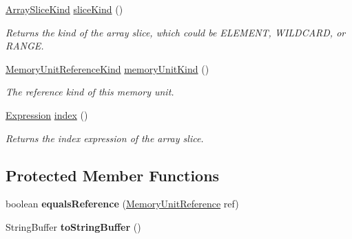 \begin{DoxyCompactItemize}
\hyperlink{enumedu_1_1udel_1_1cis_1_1vsl_1_1civl_1_1model_1_1IF_1_1expression_1_1reference_1_1ArraySliceReference_1_1ArraySliceKind}{Array\+Slice\+Kind} \hyperlink{classedu_1_1udel_1_1cis_1_1vsl_1_1civl_1_1model_1_1common_1_1expression_1_1reference_1_1CommonArraySliceReference_aa7d89fe57ead6201e27048c06e913f10}{slice\+Kind} ()
\begin{DoxyCompactList}\small\item\em Returns the kind of the array slice, which could be E\+L\+E\+M\+E\+N\+T, W\+I\+L\+D\+C\+A\+R\+D, or R\+A\+N\+G\+E. \end{DoxyCompactList}\item 
\hyperlink{enumedu_1_1udel_1_1cis_1_1vsl_1_1civl_1_1model_1_1IF_1_1expression_1_1reference_1_1MemoryUnitRef64a306b012808a0db442488810ff9534}{Memory\+Unit\+Reference\+Kind} \hyperlink{classedu_1_1udel_1_1cis_1_1vsl_1_1civl_1_1model_1_1common_1_1expression_1_1reference_1_1CommonArraySliceReference_ad154fa9f1785372b34334fec41042f1f}{memory\+Unit\+Kind} ()
\begin{DoxyCompactList}\small\item\em The reference kind of this memory unit. \end{DoxyCompactList}\item 
\hyperlink{interfaceedu_1_1udel_1_1cis_1_1vsl_1_1civl_1_1model_1_1IF_1_1expression_1_1Expression}{Expression} \hyperlink{classedu_1_1udel_1_1cis_1_1vsl_1_1civl_1_1model_1_1common_1_1expression_1_1reference_1_1CommonArraySliceReference_a6db59cd28204511eb180b111aea8dcac}{index} ()
\begin{DoxyCompactList}\small\item\em Returns the index expression of the array slice. \end{DoxyCompactList}\end{DoxyCompactItemize}
\subsection*{Protected Member Functions}
\begin{DoxyCompactItemize}
\item 
\hypertarget{classedu_1_1udel_1_1cis_1_1vsl_1_1civl_1_1model_1_1common_1_1expression_1_1reference_1_1CommonArraySliceReference_a717e367e3357d9bd8b01685ba2d30b97}{}boolean {\bfseries equals\+Reference} (\hyperlink{interfaceedu_1_1udel_1_1cis_1_1vsl_1_1civl_1_1model_1_1IF_1_1expression_1_1reference_1_1MemoryUnitReference}{Memory\+Unit\+Reference} ref)\label{classedu_1_1udel_1_1cis_1_1vsl_1_1civl_1_1model_1_1common_1_1expression_1_1reference_1_1CommonArraySliceReference_a717e367e3357d9bd8b01685ba2d30b97}

\item 
\hypertarget{classedu_1_1udel_1_1cis_1_1vsl_1_1civl_1_1model_1_1common_1_1expression_1_1reference_1_1CommonArraySliceReference_a624e4e01761708d4624b9d0c5fccd364}{}String\+Buffer {\bfseries to\+String\+Buffer} ()\label{classedu_1_1udel_1_1cis_1_1vsl_1_1civl_1_1model_1_1common_1_1expression_1_1reference_1_1CommonArraySliceReference_a624e4e01761708d4624b9d0c5fccd364}

\end{DoxyCompactItemize}
